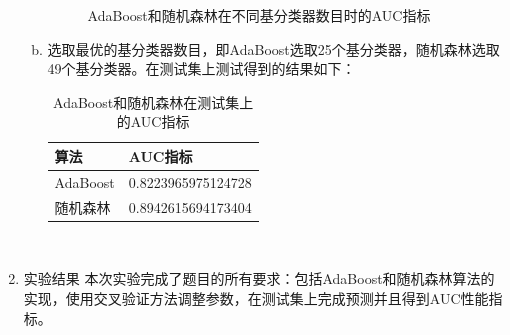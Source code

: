 \documentclass[a4paper,UTF8]{article}
\numberwithin{equation}{section}
\begin{document}
\begin{enumerate}[1.]
\begin{enumerate}[a.]
\begin{figure}[!ht]
	\caption{AdaBoost和随机森林在不同基分类器数目时的AUC指标}
	\label{fig:label}
\end{figure}
\item 选取最优的基分类器数目，即AdaBoost选取25个基分类器，随机森林选取49个基分类器。在测试集上测试得到的结果如下：
\begin{table}[!ht]
	\centering
	\caption{AdaBoost和随机森林在测试集上的AUC指标}
	\label{my-label}
	\begin{tabular}{|l|l|}
		\hline
	算法	& AUC指标 \\ \hline
	AdaBoost	& 0.8223965975124728 \\ \hline
	随机森林	&  0.8942615694173404\\ \hline
	\end{tabular}
\end{table}\\
\end{enumerate}
\item 实验结果
本次实验完成了题目的所有要求：包括AdaBoost和随机森林算法的实现，使用交叉验证方法调整参数，在测试集上完成预测并且得到AUC性能指标。
\end{enumerate}
	
\end{document}
